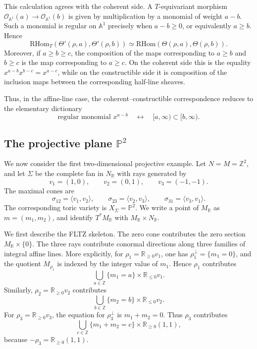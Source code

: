 This calculation agrees with the coherent side. A \(T\)-equivariant morphism \(\mathcal O_{\mathbb A^1}(a)\to \mathcal O_{\mathbb A^1}(b)\) is given by multiplication by a monomial of weight \(a-b\). Such a monomial is regular on \(\mathbb A^1\) precisely when \(a-b\ge 0\), or equivalently \(a\ge b\). Hence
\[
\mathrm{RHom}_T(\Theta'(\rho,a),\Theta'(\rho,b))
\simeq
\mathrm{RHom}(\Theta(\rho,a),\Theta(\rho,b)).
\]
Moreover, if \(a\ge b\ge c\), the composition of the maps corresponding to \(a\ge b\) and \(b\ge c\) is the map corresponding to \(a\ge c\). On the coherent side this is the equality \(x^{a-b}x^{b-c}=x^{a-c}\), while on the constructible side it is composition of the inclusion maps between the corresponding half-line sheaves.

Thus, in the affine-line case, the coherent--constructible correspondence reduces to the elementary dictionary
\[
\text{regular monomial }x^{a-b}
\quad\longleftrightarrow\quad
[a,\infty)\subset [b,\infty).
\]

\subsection{The projective plane \texorpdfstring{$\mathbb P^2$}{P2}}

We now consider the first two-dimensional projective example. Let \(N=M=\mathbb Z^2\), and let \(\Sigma\) be the complete fan in \(N_{\mathbb R}\) with rays generated by
\[
v_1=(1,0),\qquad v_2=(0,1),\qquad v_3=(-1,-1).
\]
The maximal cones are
\[
\sigma_{12}=\langle v_1,v_2\rangle,\qquad
\sigma_{23}=\langle v_2,v_3\rangle,\qquad
\sigma_{31}=\langle v_3,v_1\rangle.
\]
The corresponding toric variety is \(X_\Sigma=\mathbb P^2\). We write a point of \(M_{\mathbb R}\) as \(m=(m_1,m_2)\), and identify \(T^*M_{\mathbb R}\) with \(M_{\mathbb R}\times N_{\mathbb R}\).

We first describe the FLTZ skeleton. The zero cone contributes the zero section \(M_{\mathbb R}\times\{0\}\). The three rays contribute conormal directions along three families of integral affine lines. More explicitly, for \(\rho_1=\mathbb R_{\ge 0}v_1\), one has \(\rho_1^\perp=\{m_1=0\}\), and the quotient \(M_{\rho_1}\) is indexed by the integer value of \(m_1\). Hence \(\rho_1\) contributes
\[
\bigcup_{a\in\mathbb Z}\{m_1=a\}\times \mathbb R_{\le 0}v_1.
\]
Similarly, \(\rho_2=\mathbb R_{\ge 0}v_2\) contributes
\[
\bigcup_{b\in\mathbb Z}\{m_2=b\}\times \mathbb R_{\le 0}v_2.
\]
For \(\rho_3=\mathbb R_{\ge 0}v_3\), the equation for \(\rho_3^\perp\) is \(m_1+m_2=0\). Thus \(\rho_3\) contributes
\[
\bigcup_{c\in\mathbb Z}\{m_1+m_2=c\}\times \mathbb R_{\ge 0}(1,1),
\]
because \(-\rho_3=\mathbb R_{\ge 0}(1,1)\).

